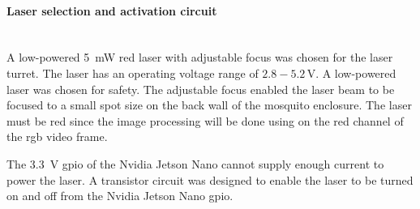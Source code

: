 \paragraph{Laser selection and activation circuit}\hfill\\
A low-powered 5~mW red laser with adjustable focus was chosen for the laser turret. The laser has an operating voltage range of $2.8 - 5.2$\,V. A low-powered laser was chosen for safety. The adjustable focus enabled the laser beam to be focused to a small spot size on the back wall of the mosquito enclosure. The laser must be red since the image processing will be done using on the red channel of the \gls{rgb} video frame.

The 3.3~V \gls{gpio} of the Nvidia Jetson Nano cannot supply enough current to power the laser. A transistor circuit was designed to enable the laser to be turned on and off from the Nvidia Jetson Nano \gls{gpio}.


